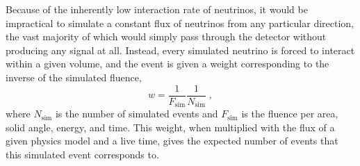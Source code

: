 Because of the inherently low interaction rate of neutrinos, it would be impractical to simulate a constant flux of neutrinos from any particular direction, the vast majority of which would simply pass through the detector without producing any signal at all. Instead, every simulated neutrino is forced to interact within a given volume, and the event is given a weight corresponding to the inverse of the simulated fluence,
\begin{equation}
    w = \frac{1}{F_{\mathrm{sim}}} \frac{1}{N_{\mathrm{sim}}}\;,
\end{equation}
where $N_{\mathrm{sim}}$ is the number of simulated events and $F_{\mathrm{sim}}$ is the fluence per area, solid angle, energy, and time. This weight, when multiplied with the flux of a given physics model and a live time, gives the expected number of events that this simulated event corresponds to.

